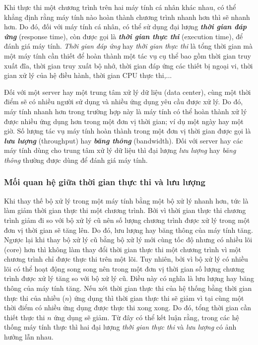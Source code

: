 Khi thực thi một chương trình trên hai máy tính cá nhân khác nhau, có thể khẳng định rằng máy tính nào hoàn thành chương trình nhanh hơn thì sẽ nhanh hơn. Do đó, đối với máy tính cá nhân, có thể sử dụng đại lượng \emph{\bfseries thời gian đáp ứng} (response time), còn được gọi là \emph{\bfseries thời gian thực thi} (execution time), để đánh giá máy tính. \emph{Thời gian đáp ứng} hay \emph{thời gian thực thi} là tổng thời gian mà một máy tính cần thiết để hoàn thành một tác vụ cụ thể bao gồm thời gian truy xuất đĩa, thời gian truy xuất bộ nhớ, thời gian đáp ứng các thiết bị ngoại vi, thời gian xử lý của hệ điều hành, thời gian CPU thực thi,...

Đối với một server hay một trung tâm xử lý dữ liệu (data center), cùng một thời điểm sẽ có nhiều người sử dụng và nhiều ứng dụng yêu cầu được xử lý. Do đó, máy tính nhanh hơn trong trường hợp này là máy tính có thể hoàn thành xử lý được nhiều ứng dụng hơn trong một đơn vị thời gian; ví dụ một ngày hay một giờ. Số lượng tác vụ máy tính hoàn thành trong một đơn vị thời gian được gọi là \emph{\bfseries lưu lượng} (throughput) hay \emph{\bfseries băng thông} (bandwidth). Đối với server hay các máy tính dùng cho trung tâm xử lý dữ liệu thì đại lượng \emph{lưu lượng} hay \emph{băng thông} thường được dùng để đánh giá máy tính.

\subsubsection{Mối quan hệ giữa thời gian thực thi và lưu lượng}
Khi thay thế bộ xử lý trong một máy tính bằng một bộ xử lý nhanh hơn, tức là làm giảm thời gian thực thi một chương trình. Bởi vì thời gian thực thi chương trình giảm đi so với bộ xử lý cũ nên số lượng chương trình được xử lý trong một đơn vị thời gian sẽ tăng lên. Do đó, lưu lượng hay băng thông của máy tính tăng. Ngược lại khi thay bộ xử lý cũ bằng bộ xử lý mới cùng tốc độ nhưng có nhiều lõi (core) hơn thì không làm thay đổi thời gian thực thi một chương trình vì một chương trình chỉ được thực thi trên một lõi. Tuy nhiên, bởi vì bộ xử lý có nhiều lõi có thể hoạt động song song nên trong một đơn vị thời gian số lượng chương trình được xử lý tăng so với bộ xử lý cũ. Điều này có nghĩa là lưu lượng hay băng thông của máy tính tăng. Nếu xét thời gian thực thi của hệ thống bằng thời gian thực thi của nhiều ($n$) ứng dụng thì thời gian thực thi sẽ giảm vì tại cùng một thời điểm có nhiều ứng dụng được thực thi xong xong. Do đó, tổng thời gian cần thiết thực thi $n$ ứng dụng sẽ giảm. Từ đây có thể kết luận rằng, trong các hệ thống máy tính thực thì hai đại lượng \emph{thời gian thực thi} và \emph{lưu lượng} có ảnh hưởng lẫn nhau.

